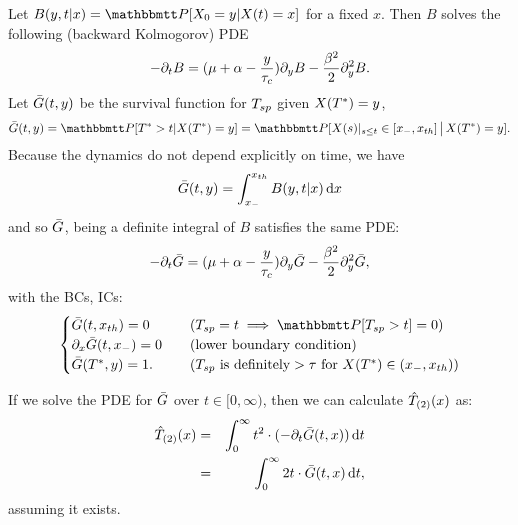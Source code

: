 Let $B(y,t|x) = \Prob[X_0 = y| X(t) = x]$ for a fixed $x$. Then $B$ solves the
following (backward Kolmogorov) PDE
\begin{equation}
-{\partial}_t B = ({\mu } + \alpha - \frac y{\tau_c}){\partial}_yB - \frac {\beta^2} 2 {\partial}_y^2 B.
\label{eq:backward_Xdensity}
\end{equation}
Let ${ \bar{G} }(t,y)$ be the survival function for $T_{sp}$ given $X({ T^* }) = y$,
$$\G(t,y) = \Prob[\T>t | X(\T) = y] = \Prob[X(s)|_{s \leq t} \in [\xmin,
\xth] \,\big|\, X(\T) = y].$$
Because the dynamics do not depend explicitly on time, we have
$$
{ \bar{G} }(t,y) = \int_{ x_{-} }^{ x_{th} } B(y,t|x) \, \mathrm{d} x
$$
and so ${ \bar{G} }$, being a definite integral of $B$ satisfies the same PDE:
\begin{equation}
-{\partial}_t { \bar{G} } = ({\mu } + \alpha - \frac y{\tau_c}) {\partial}_y{ \bar{G} } - \frac {\beta^2} 2 {\partial}_y^2 { \bar{G} },
\label{eq:backward_SDF}
\end{equation}
with the BCs, ICs:
\begin{equation}
\begin{cases}
\G(t,\xth) = 0 & \quad (\ts = t \implies \Prob[\ts>t] = 0)
\\
\di_x \G(t,\xmin) = 0  & \quad (\textrm{lower boundary condition})
\\
\G(\T, y) = 1. & \quad (\ts \textrm{ is definitely} > \t \textrm{ for } X(\T)
\in (\xmin, \xth) )
\end{cases}
\end{equation}

If we solve the PDE for ${ \bar{G} }$ over $t \in [0,\infty)$, then we can calculate
${ \hat{T}_{(2)} }(x)$ as:
\begin{eqnarray}
{ \hat{T}_{(2)} }(x) &=& \int_0^\infty t^2 \cdot (-{\partial}_t{ \bar{G} }(t,x)) \, \mathrm{d} t
\\
		   &=& \int_0^\infty 2t \cdot { \bar{G} }(t,x) \, \mathrm{d} t,
\end{eqnarray}
assuming it exists.

